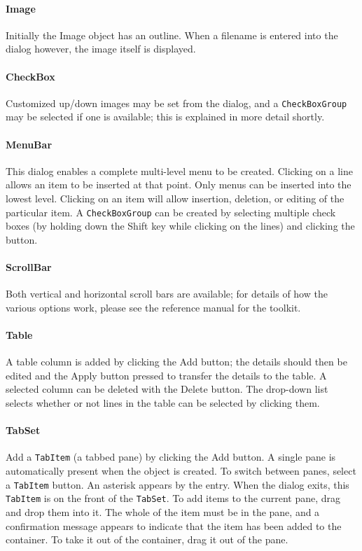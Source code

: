 \paragraph{Image}
Initially the Image object has an outline. When a filename is entered
into the dialog however, the image itself is displayed.

\paragraph{CheckBox}
Customized up/down images may be set from the dialog, and a
\texttt{CheckBoxGroup} may be selected if one is available; this is
explained in more detail shortly.

\paragraph{MenuBar}
This dialog enables a complete multi-level menu to be
created. Clicking on a line allows an item to be inserted at that
point. Only menus can be inserted into the lowest level.
Clicking on an item will allow insertion, deletion, or editing of the
particular item. A \texttt{CheckBoxGroup} can be created by selecting
multiple check boxes (by holding down the Shift key while clicking on
the lines) and clicking the button.

\paragraph{ScrollBar}
Both vertical and horizontal scroll bars are available; for details of
how the various options work, please see the reference
manual for the toolkit.

\paragraph{Table}
A table column is added by clicking the Add button; the details should
then be edited and the Apply button pressed to transfer the details to
the table. A selected column can be deleted with the Delete button. The
drop-down list selects whether or not lines in the table can be
selected by clicking them.

\paragraph[TabSet]{TabSet}
Add a \texttt{TabItem} (a tabbed pane) by clicking the Add button.
A single pane is automatically present when the object is created.
To switch between panes, select a \texttt{TabItem} button. An asterisk
appears by the entry. When the dialog exits, this
\texttt{TabItem} is on the front of the \texttt{TabSet}. To add
items to the current pane, drag and drop them into it. The whole
of the item must be in the pane, and a confirmation message appears to
indicate that the item has been added to the container. To take it out
of the container, drag it out of the pane.

